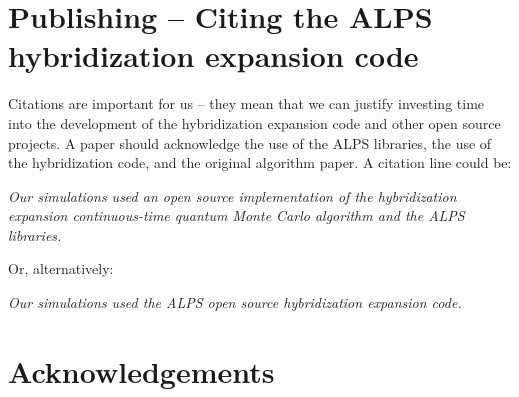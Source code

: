 \documentclass[aps,prb,floatfix,superscriptaddress,twocolumn,notitlepage]{revtex4-1}
\begin{document}
\section{Publishing -- Citing the ALPS hybridization expansion code}
Citations are important for us -- they mean that we can justify investing time into the development of the hybridization expansion code and other open source projects. A paper should acknowledge the use of the ALPS libraries, the use of the hybridization code, and the original algorithm paper. A citation line could be:

{\it
Our simulations used an open source implementation\cite{ALPS_DMFT} of the hybridization expansion continuous-time quantum Monte Carlo algorithm\cite{Werner06} and the ALPS\cite{ALPS20} libraries.
}

Or, alternatively:

{\it
Our simulations used the ALPS open source hybridization expansion code\cite{Werner06,ALPS20,ALPS_DMFT}.
}

\section{Acknowledgements}

\appendix


\end{document}
